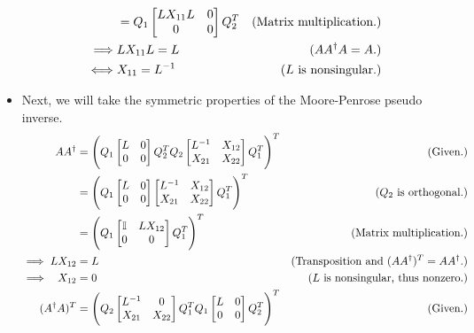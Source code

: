 \begin{solution}
\begin{itemize}
\begin{align}
            &= Q_1\begin{bmatrix}LX_{11}L &0 \\0&0\end{bmatrix}Q_2^T &\text{(Matrix multiplication.)}\nonumber\\
            \implies &LX_{11}L = L &(AA^\dag A = A.)\nonumber\\
            \iff &X_{11} = L^{-1} &\text{($L$ is nonsingular.)}\nonumber
        \end{align}
        \alignbreak
        \vspace{-5mm}
        \newpage
        \item Next, we will take the symmetric properties of the Moore-Penrose pseudo inverse.
        \alignbreak
        \begin{align}
        AA^\dag &= \Bigg( Q_1\begin{bmatrix}L &0\\0 &0\end{bmatrix}Q_2^TQ_2\begin{bmatrix}L^\inv &X_{12}\\ X_{21} &X_{22}\end{bmatrix}Q_1^T\Bigg)^T &\text{(Given.)}\nonumber\\
        &= \Bigg( Q_1\begin{bmatrix}L &0\\0 &0\end{bmatrix}\begin{bmatrix}L^\inv &X_{12}\\ X_{21} &X_{22}\end{bmatrix}Q_1^T\Bigg)^T &\text{($Q_2$ is orthogonal.)}\nonumber\\
        &= \Bigg( Q_1\begin{bmatrix}\id &LX_{12}\\0 &0\end{bmatrix}Q_1^T\Bigg)^T &\text{(Matrix multiplication.)}\nonumber\\
        \implies LX_{12} &= L &\text{(Transposition and $(AA^\dag)^T = AA^\dag$.)}\nonumber\\
        \implies \ \  X_{12} &= 0 &\text{($L$ is nonsingular, thus nonzero.)}\nonumber\\
        (A^\dag A)^T &= \Bigg( Q_2 \begin{bmatrix}L^\inv &0 \\X_{21} &X_{22}\end{bmatrix}Q_1^TQ_1\begin{bmatrix}L &0\\0&0\end{bmatrix}Q_2^T\Bigg)^T &\text{(Given.)}\nonumber\\

\end{align}
\end{itemize}
\end{solution}
